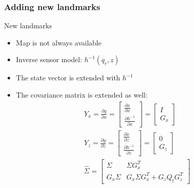 \documentclass[serif]{beamer}
\begin{document}
    \subsubsection{Adding new landmarks}
    \begin{frame}[nonumber]{New landmarks}
        \begin{itemize}
            \item{Map is not always available}
            \item{Inverse sensor model: $h^{-1}\left(q_r, z\right)$}
            \item{The state vector is extended with $h^{-1}$}
            \item{The covariance matrix is extended as well: \\
                \begin{align*}
                Y_x = \frac{\partial y}{\partial x} = \begin{bmatrix}
                    \frac{\partial x}{\partial x} \\ \frac{\partial h^{-1}}{\partial x}
                \end{bmatrix} = \begin{bmatrix}
                    I \\ G_x
                \end{bmatrix}\\
                Y_z = \frac{\partial y}{\partial z} = \begin{bmatrix}
                    \frac{\partial x}{\partial z} \\ \frac{\partial h^{-1}}{\partial z}
                \end{bmatrix} = \begin{bmatrix}
                    0 \\ G_z
                \end{bmatrix}\\
                \hat{\Sigma} = \begin{bmatrix}
                    \Sigma & \Sigma G_x^T \\
                    G_x \Sigma & G_x \Sigma G_x^T + G_z Q_t G_z^T
                \end{bmatrix}
                \end{align*}
            }
        \end{itemize}
    \end{frame}
\end{document}
